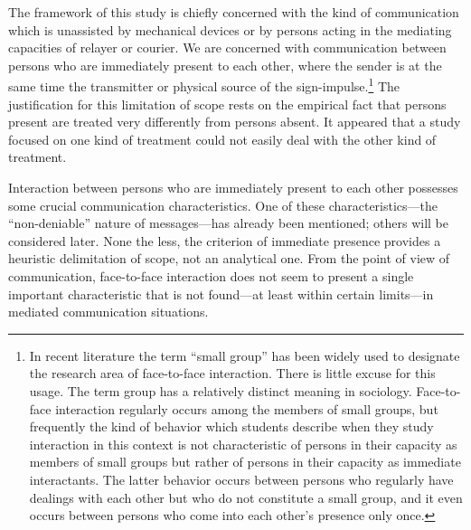 \documentclass[openany,nobib]{tufte-book}
\begin{document}
The framework of this study is chiefly concerned with the kind of
communication which is unassisted by mechanical devices or by persons
acting in the mediating capacities of relayer or courier. We are
concerned with communication between persons who are immediately present
to each other, where the sender is at the same time the transmitter or
physical source of the sign-impulse.\footnote{In recent literature the
  term ``small group'' has been widely used to designate the research
  area of face-to-face interaction. There is little excuse for this
  usage. The term group has a relatively distinct meaning in sociology.
  Face-to-face interaction regularly occurs among the members of small
  groups, but frequently the kind of behavior which students describe
  when they study interaction in this context is not characteristic of
  persons in their capacity as members of small groups but rather of
  persons in their capacity as immediate interactants. The latter
  behavior occurs between persons who regularly have dealings with each
  other but who do not constitute a small group, and it even occurs
  between persons who come into each other's presence only once.} The
justification for this limitation of scope rests on the empirical fact
that persons present are treated very differently from persons absent.
It appeared that a study focused on one kind of treatment could not
easily deal with the other kind of treatment.

Interaction between persons who are immediately present to each other
possesses some crucial communication characteristics. One of these
characteristics---the ``non-deniable'' nature of messages---has already
been mentioned; others will be considered later. None the less, the
criterion of immediate presence provides a heuristic delimitation of
scope, not an analytical one. From the point of view of communication,
face-to-face interaction does not seem to present a single important
characteristic that is not found---at least within certain limits---in
mediated communication situations.
\end{document}
